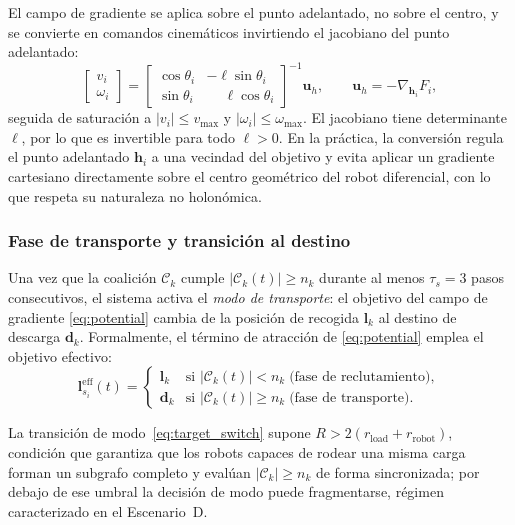 El campo de gradiente se aplica sobre el punto adelantado, no sobre el centro, y se
convierte en comandos cinemáticos invirtiendo el jacobiano del punto adelantado:
\begin{equation}
  \begin{bmatrix} v_i \\ \omega_i \end{bmatrix}
    = \begin{bmatrix} \cos\theta_i & -\ell\sin\theta_i \\
                      \sin\theta_i & \phantom{-}\ell\cos\theta_i \end{bmatrix}^{-1}
      \mathbf{u}_h, \qquad \mathbf{u}_h = -\nabla_{\mathbf{h}_i} F_i,
  \label{eq:lookahead_cmd}
\end{equation}
seguida de saturación a $|v_i| \leq v_{\max}$ y $|\omega_i| \leq \omega_{\max}$. El
jacobiano tiene determinante $\ell$, por lo que es invertible para todo $\ell > 0$.
En la práctica, la conversión regula el punto adelantado $\mathbf{h}_i$ a una
vecindad del objetivo y evita aplicar un gradiente cartesiano directamente sobre el
centro geométrico del robot diferencial, con lo que respeta su naturaleza no holonómica.

\subsubsection{Fase de transporte y transición al destino}
\label{subsubsec:transporte}

Una vez que la coalición $\mathcal{C}_k$ cumple $|\mathcal{C}_k(t)| \geq n_k$
durante al menos $\tau_s = 3$ pasos consecutivos, el sistema activa el
\emph{modo de transporte}: el objetivo del campo de gradiente \eqref{eq:potential}
cambia de la posición de recogida $\mathbf{l}_k$ al destino de descarga $\mathbf{d}_k$.
Formalmente, el término de atracción de \eqref{eq:potential} emplea el objetivo efectivo:
\begin{equation}
  \mathbf{l}_{s_i}^{\mathrm{eff}}(t) =
  \begin{cases}
    \mathbf{l}_k & \text{si } |\mathcal{C}_k(t)| < n_k \;\text{(fase de reclutamiento)},\\
    \mathbf{d}_k & \text{si } |\mathcal{C}_k(t)| \geq n_k \;\text{(fase de transporte)}.
  \end{cases}
  \label{eq:target_switch}
\end{equation}

La transición de modo~\eqref{eq:target_switch} supone
$R > 2(r_{\text{load}} + r_{\text{robot}})$, condición que garantiza que los robots
capaces de rodear una misma carga forman un subgrafo completo y evalúan
$|\mathcal{C}_k| \geq n_k$ de forma sincronizada; por debajo de ese umbral la
decisión de modo puede fragmentarse, régimen caracterizado en el Escenario~D.

